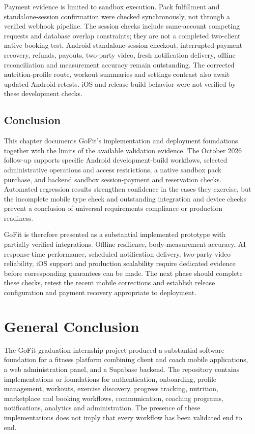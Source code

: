 \documentclass[12pt,a4paper,openany]{report}
\begin{document}
Payment evidence is limited to sandbox execution. Pack fulfillment and standalone-session confirmation were checked synchronously, not through a verified webhook pipeline. The session checks include same-account competing requests and database overlap constraints; they are not a completed two-client native booking test. Android standalone-session checkout, interrupted-payment recovery, refunds, payouts, two-party video, fresh notification delivery, offline reconciliation and measurement accuracy remain outstanding. The corrected nutrition-profile route, workout summaries and settings contrast also await updated Android retests. iOS and release-build behavior were not verified by these development checks.


\section*{Conclusion}

This chapter documents GoFit's implementation and deployment foundations together with the limits of the available validation evidence. The October 2026 follow-up supports specific Android development-build workflows, selected administrative operations and access restrictions, a native sandbox pack purchase, and backend sandbox session-payment and reservation checks. Automated regression results strengthen confidence in the cases they exercise, but the incomplete mobile type check and outstanding integration and device checks prevent a conclusion of universal requirements compliance or production readiness.

GoFit is therefore presented as a substantial implemented prototype with partially verified integrations. Offline resilience, body-measurement accuracy, AI response-time performance, scheduled notification delivery, two-party video reliability, iOS support and production scalability require dedicated evidence before corresponding guarantees can be made. The next phase should complete these checks, retest the recent mobile corrections and establish release configuration and payment recovery appropriate to deployment.


\chapter*{General Conclusion}

The GoFit graduation internship project produced a substantial software foundation for a fitness platform combining client and coach mobile applications, a web administration panel, and a Supabase backend. The repository contains implementations or foundations for authentication, onboarding, profile management, workouts, exercise discovery, progress tracking, nutrition, marketplace and booking workflows, communication, coaching programs, notifications, analytics and administration. The presence of these implementations does not imply that every workflow has been validated end to end.
\end{document}
